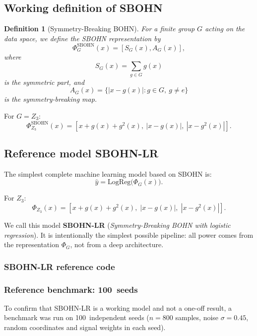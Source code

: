 \documentclass[11pt,a4paper]{report}
\newtheorem{definition}{Definition}
\begin{document}
\subsection{Working definition of SBOHN}

\begin{definition}[Symmetry-Breaking BOHN]
For a finite group $G$ acting on the data space, we define the
SBOHN representation by
\[
\Phi_G^{\mathrm{SBOHN}}(x)
=
\left[
S_G(x),A_G(x)
\right],
\]
where
\[
S_G(x)=\sum_{g\in G}g(x)
\]
is the symmetric part, and
\[
A_G(x)=\{|x-g(x)|:g\in G,\ g\neq e\}
\]
is the symmetry-breaking map.
\end{definition}

For $G=Z_3$:
\[
\Phi_{Z_3}^{\mathrm{SBOHN}}(x)
=
\left[
 x+g(x)+g^2(x),\ |x-g(x)|,\ |x-g^2(x)|
\right].
\]

\subsection{Reference model SBOHN-LR}

The simplest complete machine learning model based on SBOHN is:
\[
\boxed{
\hat y=\mathrm{LogReg}\bigl(\Phi_G(x)\bigr).
}
\]

For $Z_3$:
\[
\Phi_{Z_3}(x)=
[x+g(x)+g^2(x),\;|x-g(x)|,\;|x-g^2(x)|].
\]

We call this model \textbf{SBOHN-LR} (\emph{Symmetry-Breaking BOHN with logistic regression}).
It is intentionally the simplest possible pipeline: all power comes from the representation $\Phi_G$,
not from a deep architecture.

\subsubsection{SBOHN-LR reference code}

\noindent{}


\subsubsection{Reference benchmark: 100~seeds}

To confirm that SBOHN-LR is a working model and not a one-off result,
a benchmark was run on 100~independent seeds ($n=800$ samples, noise $\sigma=0.45$,
random coordinates and signal weights in each seed).
\end{document}
